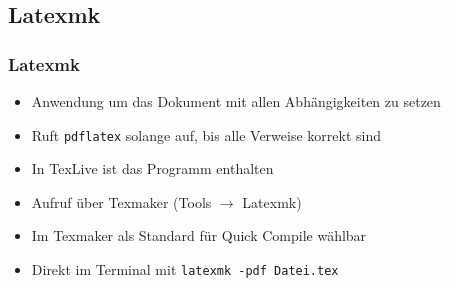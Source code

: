 \subsection{Latexmk}

\begin{frame}[fragile]
\frametitle{Latexmk}
\begin{itemize}
  \item Anwendung um das Dokument mit allen Abhängigkeiten zu setzen
  \item Ruft \texttt{pdflatex} solange auf, bis alle Verweise korrekt sind\pause\medskip
  \item In TexLive ist das Programm enthalten
  \item Aufruf über Texmaker (Tools \(\rightarrow\) Latexmk)
  \item Im Texmaker als Standard für Quick Compile wählbar\pause\medskip
  \item Direkt im Terminal mit \verb+latexmk -pdf Datei.tex+
\end{itemize}
\end{frame}